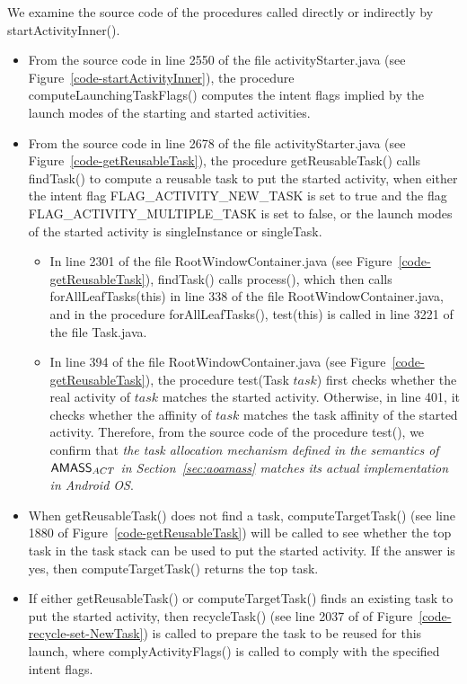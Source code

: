 We examine the source code of the procedures called directly or indirectly by startActivityInner(). 
\begin{itemize}
\item From the source code in line 2550 of the file activityStarter.java (see Figure~\ref{code-startActivityInner}), the procedure computeLaunchingTaskFlags() computes the intent flags implied by the launch modes of the starting and started activities. 
%
\item From the source code in line 2678 of the file activityStarter.java (see Figure~\ref{code-getReusableTask}), the procedure getReusableTask() calls findTask() to compute a reusable task to put the started activity, when either the intent flag FLAG\_ACTIVITY\_NEW\_TASK is set to true and the flag FLAG\_ACTIVITY\_MULTIPLE\_TASK is set to false, or the launch modes of the started activity is singleInstance or singleTask.
\begin{itemize}
\item In line 2301 of the file RootWindowContainer.java (see Figure~\ref{code-getReusableTask}), findTask() calls process(), which then calls forAllLeafTasks(this) in line 338 of the file  RootWindowContainer.java, and in the procedure forAllLeafTasks(), test(this) is called in line 3221 of the file Task.java. 
%
\item In line 394 of the file RootWindowContainer.java (see Figure~\ref{code-getReusableTask}), the procedure test(Task $task$) first checks whether the real activity of $task$ matches the started activity. Otherwise, in line 401, it checks whether the affinity of $task$ matches the task affinity of the started activity. Therefore, from the source code of the procedure test(), we confirm that \emph{the task allocation mechanism defined in the semantics of $\textsf{AMASS}_{ACT}$ in Section~\ref{sec:aoamass} matches its actual implementation in Android OS}. 
\end{itemize}
%
\item When getReusableTask() does not find a task, computeTargetTask() (see line 1880 of Figure~\ref{code-getReusableTask}) will be called to see whether the top task in the task stack can be used to put the started activity. If the answer is yes, then computeTargetTask() returns the top task. 
%
\item If either getReusableTask() or computeTargetTask() finds an existing task to put the started activity, then recycleTask() (see line 2037 of of Figure~\ref{code-recycle-set-NewTask}) is called to prepare the task to be reused for this launch, where complyActivityFlags() is called to comply with the specified intent flags. 
%


\end{itemize}
